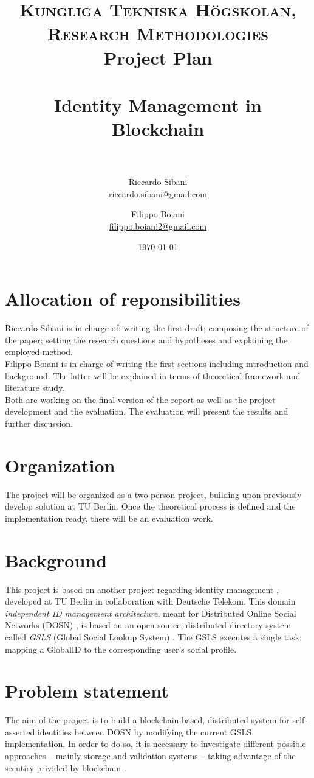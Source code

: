 \documentclass[paper=a4, fontsize=11pt]{scrartcl} %
\title{
\normalfont \normalsize
\textsc{Kungliga Tekniska Högskolan, Research Methodologies} \\ [10pt] %
Project Plan \\ [16pt]
\horrule{0.5pt} \\[0.5pt] %
\huge Identity Management in Blockchain \\ %
\vspace{5mm}
\horrule{1pt} \\[0.5cm] %
}
\author{Riccardo Sibani \\ \href{mailto:riccardo.sibani@gmail.com}{riccardo.sibani@gmail.com}
   \and Filippo Boiani \\ \href{mailto:filippo.boiani2@gmail.com}{filippo.boiani2@gmail.com} } %
\date{\normalsize\today} %
\numberwithin{equation}{section} %
\numberwithin{figure}{section} %
\numberwithin{table}{section} %
\begin{document}
\maketitle %

\section{Allocation of reponsibilities}
Riccardo Sibani is in charge of: writing the first draft; composing the structure of the paper; setting the research questions and hypotheses and explaining the employed method.
\\

Filippo Boiani is in charge of writing the first sections including introduction and background. The latter will be explained in terms of theoretical framework and literature study. 
\\

Both are working on the final version of the report as well as the project development and the evaluation. The evaluation will present the results and further discussion. 

\section{Organization}
The project will be organized as a two-person project, building upon previously develop solution at TU Berlin. Once the theoretical process is defined and the implementation ready, there will be an evaluation work.

\section{Background}
This project is based on another project regarding identity management \cite{identityMgmt2003} \cite{gondor2016distributed}, developed at TU Berlin in collaboration with Deutsche Telekom. This domain \textit{independent ID management architecture}, meant for Distributed Online Social Networks (DOSN) \cite{gondor2014sonic}, is based on an open source, distributed directory system called \textit{GSLS} (Global Social Lookup System) \cite{gondor2016distributed}. The GSLS executes a single task: mapping a GlobalID to the corresponding user's social profile. 

\section{Problem statement}
The aim of the project is to build a blockchain-based, distributed system for self-asserted identities between DOSN \cite{blockchain-id-mgmt2017} by modifying the current GSLS implementation. In order to do so, it is necessary to investigate different possible approaches -- mainly storage and validation systems -- taking advantage of the secutiry privided by blockchain \cite{nakamoto2008bitcoin}. 
\\
\end{document}
